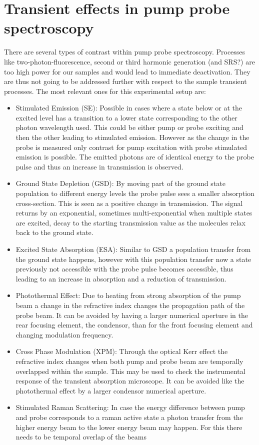 \documentclass[twoside,openright]{scrreprt}
\begin{document}
\section{Transient effects in pump probe spectroscopy}
There are several types of contrast within pump probe spectroscopy. Processes like two-photon-fluorescence, second or third harmonic generation (and SRS?) are too high power for our samples and would lead to immediate deactivation. They are thus not going to be addressed further with respect to the sample transient processes. The most relevant ones for this experimental setup are:\cite{10.1063/1.5129123}
\begin{itemize}
\item Stimulated Emission (SE): Possible in cases where a state below or at the  excited level has a transition to a lower state corresponding to the other photon wavelength used. This could be either pump or probe exciting and then the other leading to stimulated emission. However as the change in the probe is measured only contrast for pump excitation with probe stimulated emission is possible. The emitted photons are of identical energy to the probe pulse and thus an increase in transmission is observed.
\item Ground State Depletion (GSD): By moving part of the ground state population to different energy levels the probe pulse sees a smaller absorption cross-section. This is seen as a positive change in transmission. The signal returns by an exponential, sometimes multi-exponential when multiple states are excited, decay to the starting transmission value as the molecules relax back to the ground state.
\item Excited State Absorption (ESA): Similar to GSD a population transfer from the ground state happens, however with this population transfer now a state previously not accessible with the probe pulse becomes accessible, thus leading to an increase in absorption and a reduction of transmission.
\item Photothermal Effect: Due to heating from strong absorption of the pump beam a change in the refractive index changes the propagation path of the probe beam. It can be avoided by having a larger numerical aperture in the rear focusing element, the condensor, than for the front focusing element and changing modulation frequency.
\item Cross Phase Modulation (XPM): Through the optical Kerr effect the refractive index changes when both pump and probe beam are temporally overlapped within the sample. This may be used to check the instrumental response of the transient absorption microscope. It can be avoided like the photothermal effect by a larger condensor numerical aperture.
\item Stimulated Raman Scattering: In case the energy difference between pump and probe corresponds to a raman active state a photon transfer from the higher energy beam to the lower energy beam may happen. For this there needs to be temporal overlap of the beams
\end{itemize}
\end{document}
